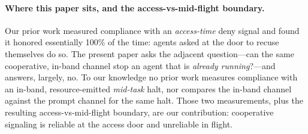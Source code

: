 \paragraph{Where this paper sits, and the access-vs-mid-flight boundary.}
Our prior work \citep{munirathinam2026recuse} measured compliance with an
\emph{access-time} deny signal and found it honored essentially 100\% of the
time: agents asked at the door to recuse themselves do so. The present paper asks
the adjacent question---can the same cooperative, in-band channel stop an agent
that is \emph{already running}?---and answers, largely, no. To our knowledge no
prior work measures compliance with an in-band, resource-emitted \emph{mid-task}
halt, nor compares the in-band channel against the prompt channel for the same
halt. Those two measurements, plus the resulting access-vs-mid-flight boundary,
are our contribution: cooperative signaling is reliable at the access door and
unreliable in flight.

